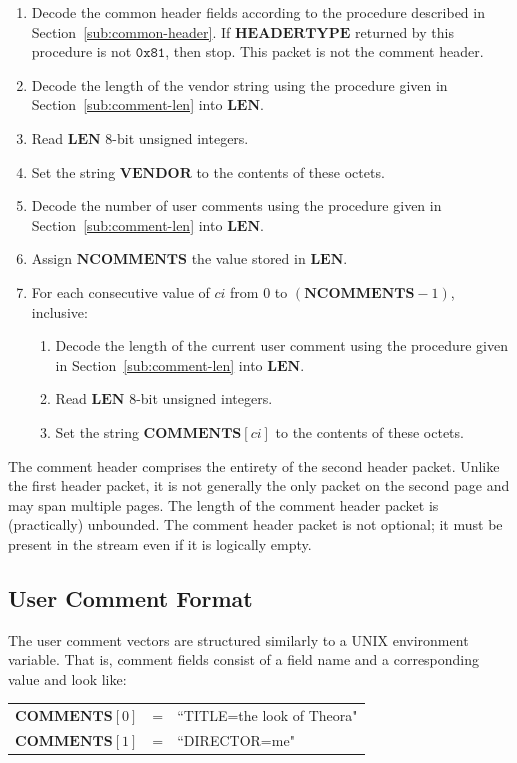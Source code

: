\documentclass[9pt,letterpaper]{book}
\makeatletter
\newcommand{\idx}[1]{{\ensuremath{\mathit{#1}}}}
\newcommand{\ci}{\idx{ci}}
\newcommand{\bitvar}[1]{\ensuremath{\mathbf{\bm{#1}}}}
\newcommand{\locvar}[1]{\ensuremath{\mathrm{#1}}}
\newcommand{\hex}[1]{\ensuremath{\mathtt{0x#1}}}
\numberwithin{equation}{chapter}
\numberwithin{figure}{chapter}
\numberwithin{table}{chapter}
\renewcommand{\paragraph}{\@startsection{paragraph}{4}{0ex}%
 {-3.25ex plus -1ex minus -0.2ex}%
 {1.5ex plus 0.2ex}%
 {\normalfont\normalsize\bfseries}}
\makeatother
\begin{document}
\begin{enumerate}
\item
Decode the common header fields according to the procedure described in
 Section~\ref{sub:common-header}.
If \bitvar{HEADERTYPE} returned by this procedure is not \hex{81}, then stop.
This packet is not the comment header.
\item
Decode the length of the vendor string using the procedure given in
 Section~\ref{sub:comment-len} into \bitvar{LEN}.
\item
Read \bitvar{LEN} 8-bit unsigned integers.
\item
Set the string \bitvar{VENDOR} to the contents of these octets.
\item
Decode the number of user comments using the procedure given in
 Section~\ref{sub:comment-len} into \bitvar{LEN}.
\item
Assign \bitvar{NCOMMENTS} the value stored in \bitvar{LEN}.
\item
For each consecutive value of \locvar{\ci} from $0$ to
 $(\bitvar{NCOMMENTS}-1)$, inclusive:
\begin{enumerate}
\item
Decode the length of the current user comment using the procedure given in
 Section~\ref{sub:comment-len} into \bitvar{LEN}.
\item
Read \bitvar{LEN} 8-bit unsigned integers.
\item
Set the string $\bitvar{COMMENTS}[\locvar{\ci}]$ to the contents of these
 octets.
\end{enumerate}
\end{enumerate}

The comment header comprises the entirety of the second header packet.
Unlike the first header packet, it is not generally the only packet on the
 second page and may span multiple pages.
The length of the comment header packet is (practically) unbounded.
The comment header packet is not optional; it must be present in the stream
 even if it is logically empty.


\subsection{User Comment Format}

The user comment vectors are structured similarly to a UNIX environment
 variable.
That is, comment fields consist of a field name and a corresponding value and
 look like:
\begin{center}
\begin{tabular}{rcl}
$\bitvar{COMMENTS}[0]$ & = & ``TITLE=the look of Theora" \\
$\bitvar{COMMENTS}[1]$ & = & ``DIRECTOR=me"
\end{tabular}
\end{center}
\end{document}

